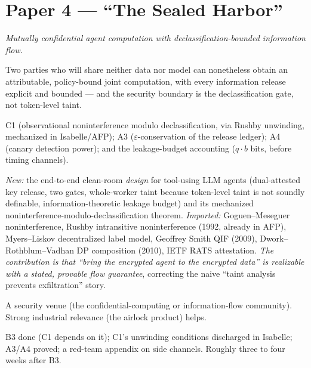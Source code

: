 \documentclass[11pt,a4paper]{article}
\begin{document}
\section{Paper 4 --- ``The Sealed Harbor''}
\emph{Mutually confidential agent computation with declassification-bounded information flow.}
\begin{description}[leftmargin=0em,style=unboxed]
\item[Thesis.] Two parties who will share neither data nor model can nonetheless obtain an attributable, policy-bound joint computation, with every information release explicit and bounded --- and the security boundary is the declassification gate, not token-level taint.
\item[Results.] C1 (observational noninterference modulo declassification, via Rushby unwinding, mechanized in Isabelle/AFP); A3 ($\varepsilon$-conservation of the release ledger); A4 (canary detection power); and the leakage-budget accounting ($q\cdot b$ bits, before timing channels).
\item[Novelty, honestly.] \emph{New:} the end-to-end clean-room \emph{design} for tool-using LLM agents (dual-attested key release, two gates, whole-worker taint because token-level taint is not soundly definable, information-theoretic leakage budget) and its mechanized noninterference-modulo-declassification theorem. \emph{Imported:} Goguen--Meseguer noninterference, Rushby intransitive noninterference (1992, already in AFP), Myers--Liskov decentralized label model, Geoffrey Smith QIF (2009), Dwork--Rothblum--Vadhan DP composition (2010), IETF RATS attestation. \emph{The contribution is that ``bring the encrypted agent to the encrypted data'' is realizable with a stated, provable flow guarantee}, correcting the naive ``taint analysis prevents exfiltration'' story.
\item[Venue.] A security venue (the confidential-computing or information-flow community). Strong industrial relevance (the airlock product) helps.
\item[Gate.] B3 done (C1 depends on it); C1's unwinding conditions discharged in Isabelle; A3/A4 proved; a red-team appendix on side channels. Roughly three to four weeks after B3.
\end{description}
\end{document}
